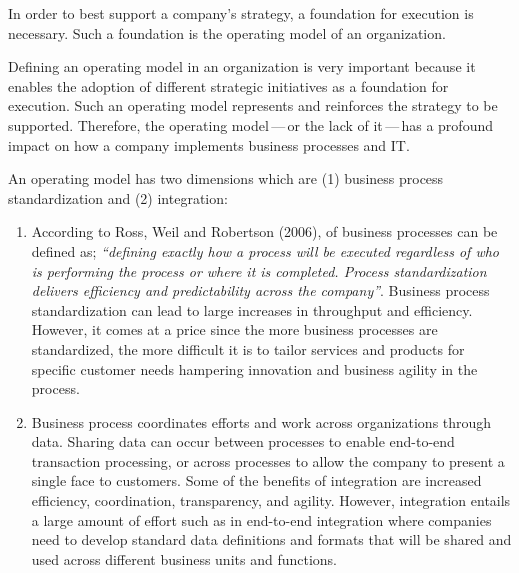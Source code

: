 %
%

In order to best support a company’s strategy, a foundation for execution is necessary.
Such a foundation is the operating model of an organization.


Defining an operating model in an organization is very important because it enables the
adoption of different strategic initiatives as a foundation for execution.
Such an operating model represents and reinforces the strategy to be supported.
Therefore, the operating model\,---\,or the lack of it\,---\,has a profound impact on how a company
implements business processes and IT.

An operating model has two dimensions which are (1) business process standardization and (2) integration:

\begin{enumerate}
    \item According to Ross, Weil and Robertson (2006),  of business processes can be defined as;
          \textit{“defining exactly how a process will be executed regardless of who is performing the process or
          where it is completed.
          Process standardization delivers efficiency and predictability across the company”}.
          Business process standardization can lead to large increases in throughput and efficiency.
          However, it comes at a price since the more business processes are standardized,
          the more difficult it is to tailor services and products for specific customer needs hampering
          innovation and business agility in the process.
    \item Business process  coordinates efforts and work across organizations through data.
          Sharing data can occur between processes to enable end-to-end transaction processing,
          or across processes to allow the company to present a single face to customers.
          Some of the benefits of integration are increased efficiency, coordination, transparency, and agility.
          However, integration entails a large amount of effort such as in end-to-end integration where companies
          need to develop standard data definitions and formats that will be shared and used across different
          business units and functions.
\end{enumerate}

